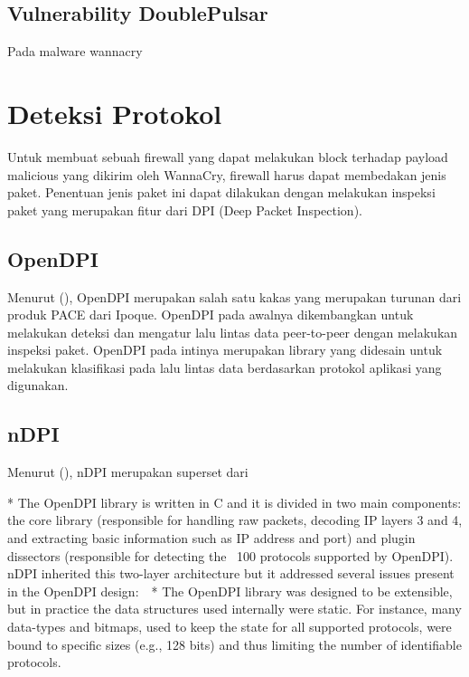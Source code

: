 \subsection{Vulnerability DoublePulsar}


Pada malware wannacry

\section{Deteksi Protokol}
Untuk membuat sebuah firewall yang dapat melakukan block terhadap payload malicious yang dikirim oleh WannaCry, firewall harus dapat membedakan jenis paket. Penentuan jenis paket ini dapat dilakukan dengan melakukan inspeksi paket yang merupakan fitur dari DPI (Deep Packet Inspection).

\subsection{OpenDPI}
Menurut (\cite{khalife2013performance}), OpenDPI merupakan salah satu kakas yang merupakan turunan dari produk PACE dari Ipoque. OpenDPI pada awalnya dikembangkan untuk melakukan deteksi dan mengatur lalu lintas data peer-to-peer dengan melakukan inspeksi paket. OpenDPI pada intinya merupakan library yang didesain untuk melakukan klasifikasi pada lalu lintas data berdasarkan protokol aplikasi yang digunakan.

\subsection{nDPI}

Menurut (\cite{deri2014ndpi}), nDPI merupakan superset dari 


* The OpenDPI library is written in C and it is divided in two main components: the core library (responsible for handling raw packets, decoding IP layers 3 and 4, and extracting basic information such as IP address and port) and plugin dissectors (responsible for detecting the ~100 protocols supported by OpenDPI). nDPI inherited this two-layer architecture but it addressed several issues present in the OpenDPI design:  
* The OpenDPI library was designed to be extensible, but in practice the data structures used internally were static. For instance, many data-types and bitmaps, used to keep the state for all supported protocols, were bound to specific sizes (e.g., 128 bits) and thus limiting the number of identifiable protocols. 

